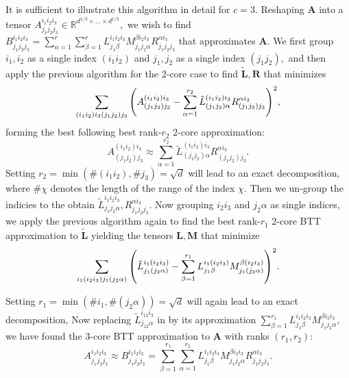 \documentclass{article}
\newcommand{\mbf}[1]{{\boldsymbol{\mathbf{#1}}}}
\newcommand{\bm}{\mbf}
\theoremstyle{plain}
\theoremstyle{definition}
\theoremstyle{remark}
\newcommand{\R}{\mathbb{R}}
\begin{document}
It is sufficient to illustrate this algorithm in detail for $c=3.$ Reshaping $\bm{A}$ into a tensor $A^{i_1 i_2 i_3}_{j_1 j_2 j_3} \in \R^{d^{1/3}\times\ldots\times d^{1/3}},$ we wish to find $B^{i_1 i_2 i_3}_{j_1 j_2 j_3} = \sum_{\alpha=1}^{r} \sum_{\beta=1}^{r} L^{i_1 i_2 i_3}_{j_1 \beta} M^{\beta i_2 i_3}_{j_1 j_2 \alpha} R^{\alpha i_3}_{j_1 j_2 j_3}$ that approximates $\bm{A}.$ We first group $i_1,i_2$ as a single index $(i_1 i_2)$ and $j_1,j_2$ as a single index $(j_1 j_2),$ and then apply the previous algorithm for the 2-core case to find $\tilde{\bm{L}}, \bm{R}$ that minimizes
\begin{equation}
    \sum_{(i_1 i_2) i_3 (j_1 j_2) j_3} \qty(A^{(i_1 i_2) i_3}_{(j_1 j_2) j_3} - \sum_{\alpha=1}^{r_2} \tilde{L}^{(i_1 i_2) i_3}_{(j_1 j_2) \alpha} R^{\alpha i_3}_{(j_1 j_2) j_3})^2,
\end{equation}
forming the best following best rank-$r_2$ 2-core approximation:
\begin{equation}
    \label{eq:2core}
    A^{(i_1 i_2) i_3}_{(j_1 j_2) j_3} \approx \sum_{\alpha=1}^{r_2} \tilde{L}^{(i_1 i_2) i_3}_{(j_1 j_2) \alpha} R^{\alpha i_3}_{(j_1 j_2) j_3}.
\end{equation}
Setting $r_2 = \min(\#(i_1 i_2), \# j_3) = \sqrt{d}$ will lead to an exact decomposition, where $\# \chi$ denotes the length of the range of the index $\chi$.
Then we un-group the indicies to the obtain $\tilde{L}^{i_1 i_2 i_3}_{j_1 j_2 \alpha}, R^{\alpha i_3}_{j_1 j_2 j_3}.$ Now grouping $i_2 i_3$ and $j_2 \alpha$ as single indices, we apply the previous algorithm again to find the best rank-$r_1$ 2-core BTT approximation to $\tilde{\bm{L}}$ yielding the tensors $\bm{L}, \bm{M}$ that minimize
\begin{equation}
    \sum_{i_1 (i_2 i_3) j_1 (j_2 \alpha)} \qty(\tilde{L}^{i_1 (i_2 i_3)}_{j_1 (j_2 \alpha)} - \sum_{\beta=1}^{r_1} L^{i_1 (i_2 i_3)}_{j_1 \beta} M^{\beta (i_2 i_3)}_{j_1 (j_2\alpha)})^2. \\
\end{equation}

Setting $r_1 = \min(\# i_1, \# (j_2 \alpha)) = \sqrt{d}$ will again lead to an exact decomposition,
Now replacing $\tilde{L}^{i_{12} i_3}_{j_{12} \alpha}$ in  by its approximation $\sum_{\beta=1}^{r_1} L^{i_1 i_2 i_3}_{j_1 \beta} M^{\beta i_2 i_3}_{j_1 j_2\alpha},$ we have found the 3-core BTT approximation to $\bm{A}$ with ranks $(r_1, r_2):$
\begin{equation}
    A^{i_1 i_2 i_3}_{j_1 j_2 j_3} \approx B^{i_1 i_2 i_3}_{j_1 j_2 j_3} = \sum_{\beta=1}^{r_1} \sum_{\alpha=1}^{r_2} L^{i_1 i_2 i_3}_{j_1 \beta} M^{\beta i_2 i_3}_{j_1 j_2 \alpha} R^{\alpha i_3}_{j_1 j_2 j_3}.
\end{equation}
\end{document}
